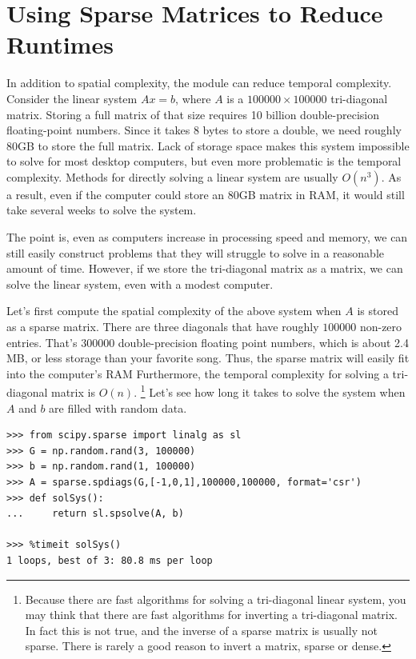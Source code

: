 \section*{Using Sparse Matrices to Reduce Runtimes} %

In addition to spatial complexity, the  module can reduce temporal complexity.
Consider the linear system $A x = b$, where $A$ is a $100000\times 100000$ tri-diagonal matrix.
Storing a full matrix of that size requires 10 billion double-precision floating-point numbers.
Since it takes 8 bytes to store a double, we need roughly 80GB to store the full matrix.
Lack of storage space makes this system impossible to solve for most desktop computers, but even more problematic is the temporal complexity.
Methods for directly solving a linear system are usually $O(n^3)$.
As a result, even if the computer could store an 80GB matrix in RAM, it would still take several weeks to solve the system.

The point is, even as computers increase in processing speed and memory, we can still easily construct problems that they will struggle to solve in a reasonable amount of time.
However, if we store the tri-diagonal matrix as a  matrix, we can solve the linear system, even with a modest computer.

Let's first compute the spatial complexity of the above system when $A$ is stored as a sparse matrix.
There are three diagonals that have roughly $100000$ non-zero entries.
That's $300000$ double-precision floating point numbers, which is about 2.4 MB, or less storage than your favorite song.
Thus, the sparse matrix will easily fit into the computer's RAM
Furthermore, the temporal complexity for solving a tri-diagonal matrix is $O(n)$.
\footnote{Because there are fast algorithms for solving a tri-diagonal linear system, you may think that there are fast algorithms for inverting a tri-diagonal matrix.
In fact this is not true, and the inverse of a sparse matrix is usually not sparse.
There is rarely a good reason to invert a matrix, sparse or dense.}
Let's see how long it takes to solve the system when $A$ and $b$ are filled with random data.

\begin{lstlisting}
>>> from scipy.sparse import linalg as sl
>>> G = np.random.rand(3, 100000)
>>> b = np.random.rand(1, 100000)
>>> A = sparse.spdiags(G,[-1,0,1],100000,100000, format='csr')
>>> def solSys():
...     return sl.spsolve(A, b)

>>> %timeit solSys()
1 loops, best of 3: 80.8 ms per loop

\end{lstlisting}


